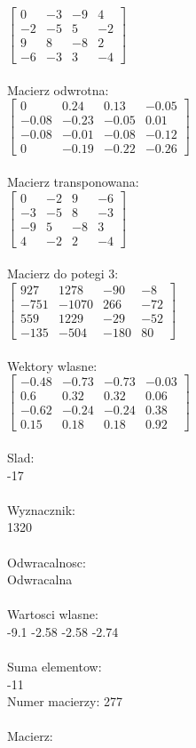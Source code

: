 \documentclass[a4paper,12pt]{article}
\begin{document}
$\begin{bmatrix} 0&-3&-9&4\\-2&-5&5&-2\\9&8&-8&2\\-6&-3&3&-4 \end{bmatrix}$
\\
\\
Macierz odwrotna:\\

$\begin{bmatrix} 0&0.24&0.13&-0.05\\-0.08&-0.23&-0.05&0.01\\-0.08&-0.01&-0.08&-0.12\\0&-0.19&-0.22&-0.26 \end{bmatrix}$
\\
\\
Macierz transponowana:\\

$\begin{bmatrix} 0&-2&9&-6\\-3&-5&8&-3\\-9&5&-8&3\\4&-2&2&-4 \end{bmatrix}$
\\
\\
Macierz do potegi 3:\\

$\begin{bmatrix} 927&1278&-90&-8\\-751&-1070&266&-72\\559&1229&-29&-52\\-135&-504&-180&80 \end{bmatrix}$
\\
\\
Wektory wlasne:\\

$\begin{bmatrix} -0.48&-0.73&-0.73&-0.03\\0.6&0.32&0.32&0.06\\-0.62&-0.24&-0.24&0.38\\0.15&0.18&0.18&0.92 \end{bmatrix}$
\\
\\
Slad:\\
-17
\\
\\
Wyznacznik:\\
1320
\\
\\
Odwracalnosc:\\
Odwracalna
\\
\\
Wartosci wlasne:\\
-9.1 -2.58 -2.58 -2.74
\\
\\
Suma elementow:\\
-11
\\
\newpage
Numer macierzy:
277
\\
\\
Macierz:\\
\end{document}
